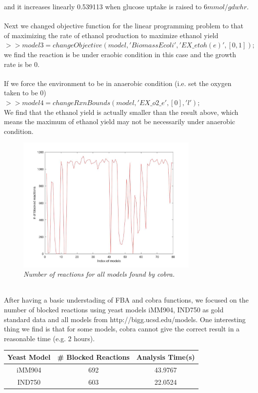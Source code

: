 \documentclass[11pt, a4paper]{article}
\begin{document}
	and it increases linearly 0.539113 when glucose uptake is raised to $6 mmol/gdw hr$.\\
	~\\Next we changed objective function for the linear programming problem to that of maximizing the rate of ethanol production to maximize ethanol yield\\
	$>>model3=changeObjective(model,{'BiomassEcoli','EX\_etoh(e)'},[0,1]);$\\
	we find the reaction is be under eraobic condition in this case and the growth rate is be 0.\\
	~\\If we force the environment to be in anaerobic condition (i.e. set the oxygen taken to be 0)\\$>>model4=changeRxnBounds(model,'EX\_o2\_e',[0],'l');$\\We find that the ethanol yield is actually smaller than the result above, which means the maximum of ethanol yield may not be necessarily under anaerobic condition.\\
	\begin{figure}[H]
  		\centering
      	\includegraphics[width=0.8\textwidth]{cobra_all_model_reaction.jpg}
      	\caption{\textit{Number of reactions for all models found by cobra.}}
	\end{figure}
	~\\After having a basic understading of FBA and cobra functions, we focused on the number of blocked reactions using yeast models iMM904, IND750 as gold standard data and all models from http://bigg.ucsd.edu/models. One interesting thing we find is that for some models, cobra cannot give the correct result in a reasonable time (e.g. 2 hours).
	\begin{center}
	\begin{tabular}{|c|c|c|} 
	 \hline
	 Yeast Model & \# Blocked Reactions & Analysis Time(s)\\
	 \hline 
	 iMM904 & 692 & 43.9767 \\
	 IND750 & 603 & 22.0524 \\
	 \hline
	\end{tabular}
	\end{center}
\end{document}
